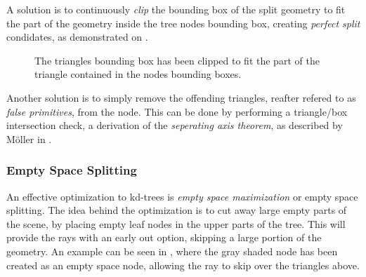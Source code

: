 A solution is to continuously \textit{clip} the bounding box of the
split geometry to fit the part of the geometry inside the tree nodes
bounding box, creating \textit{perfect split} condidates, as
demonstrated on .

\begin{figure}
  \centering
  \caption{The triangles bounding box has been clipped to fit the part
  of the triangle contained in the nodes bounding boxes.}
  \label{fig:aabbClipped}
\end{figure}

Another solution is to simply remove the offending triangles, reafter
refered to as \textit{false primitives}, from the node. This can be
done by performing a triangle/box intersection check, a derivation of
the \textit{seperating axis theorem}, as described by Möller in
.


\subsubsection{Empty Space Splitting}

An effective optimization to kd-trees is \textit{empty space
  maximization} or empty space splitting. The idea behind the
optimization is to cut away large empty parts of the scene, by placing
empty leaf nodes in the upper parts of the tree. This will provide the
rays with an early out option, skipping a large portion of the
geometry. An example can be seen in ,
where the gray shaded node has been created as an empty space node,
allowing the ray to skip over the triangles above.

